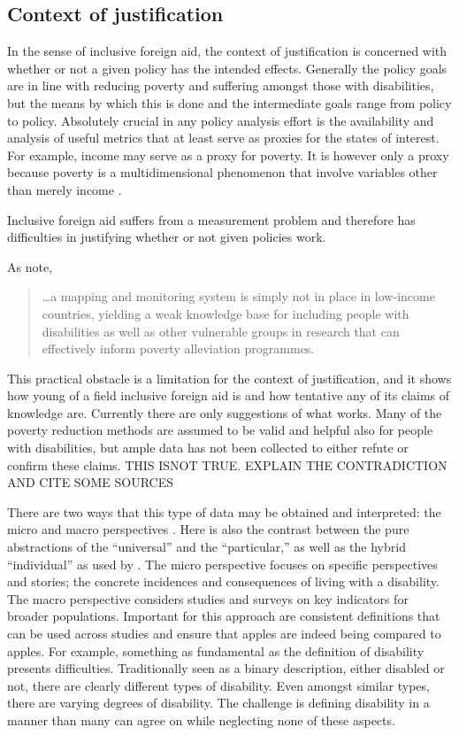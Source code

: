 \documentclass[a4paper]{article}
\begin{document}
\subsection{Context of justification}

In the sense of inclusive foreign aid, the context of justification is
concerned with whether or not a given policy has the intended effects.
Generally the policy goals are in line with reducing poverty and suffering
amongst those with disabilities, but the means by which this is done and the
intermediate goals range from policy to policy. Absolutely crucial in any
policy analysis effort is the availability and analysis of useful metrics that
at least serve as proxies for the states of interest. For example, income may
serve as a proxy for poverty. It is however only a proxy because poverty is a
multidimensional phenomenon that involve variables other than merely income
\cite{alkire2011understandings}.

Inclusive foreign aid suffers from a measurement problem and therefore has
difficulties in justifying whether or not given policies work.

As \cite{ingstad2011disability} note, 

\begin{quote}
\ldots a mapping and monitoring system is simply not in place in low-income
countries, yielding a weak knowledge base for including people with
disabilities as well as other vulnerable groups in research that can
effectively inform poverty alleviation programmes.
\end{quote}

This practical obstacle is a limitation for the context of justification, and
it shows how young of a field inclusive foreign aid is and how tentative any
of its claims of knowledge are. Currently there are only suggestions of what
works. Many of the poverty reduction methods are assumed to be valid and
helpful also for people with disabilities, but ample data has not been
collected to either refute or confirm these claims.  THIS ISNOT TRUE. EXPLAIN
THE CONTRADICTION AND CITE SOME SOURCES

There are two ways that this type of data may be obtained and interpreted: the
micro and macro perspectives \citep{ingstad2011disability}. Here is also the
contrast between the pure abstractions of the ``universal'' and the
``particular,'' as well as the hybrid ``individual'' as used by
\cite{collingwood1922history}. The micro perspective focuses on specific
perspectives and stories; the  concrete incidences and consequences of living
with a disability. The macro perspective considers studies and surveys on key
indicators for broader populations. Important for this approach are consistent
definitions that can be used across studies and ensure that apples are indeed
being compared to apples. For example, something as fundamental as the
definition of disability presents difficulties. Traditionally seen as a binary
description, either disabled or not, there are clearly different types of
disability. Even amongst similar types, there are varying degrees of
disability. The challenge is defining disability in a manner than many can
agree on while neglecting none of these aspects.
\end{document}
